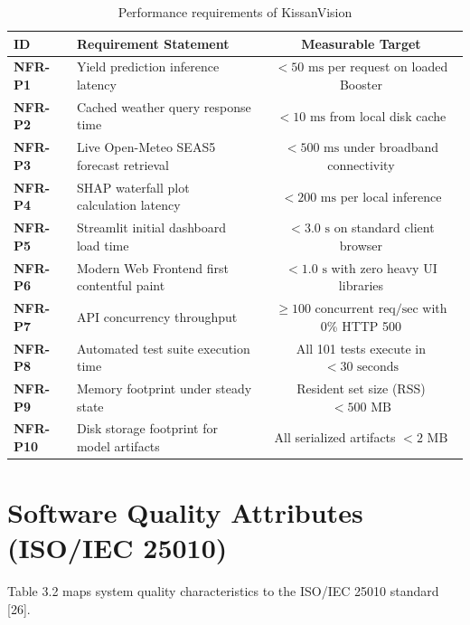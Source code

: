 \documentclass[11pt,a4paper]{report}
\begin{document}
\begin{table}[htbp]
\centering
\small
\caption{Performance requirements of KissanVision}
\begin{tabularx}{\textwidth}{lXc}
\toprule
\textbf{ID} & \textbf{Requirement Statement} & \textbf{Measurable Target} \\
\midrule
\textbf{NFR-P1} & Yield prediction inference latency & $< 50\text{ ms}$ per request on loaded Booster \\
\textbf{NFR-P2} & Cached weather query response time & $< 10\text{ ms}$ from local disk cache \\
\textbf{NFR-P3} & Live Open-Meteo SEAS5 forecast retrieval & $< 500\text{ ms}$ under broadband connectivity \\
\textbf{NFR-P4} & SHAP waterfall plot calculation latency & $< 200\text{ ms}$ per local inference \\
\textbf{NFR-P5} & Streamlit initial dashboard load time & $< 3.0\text{ s}$ on standard client browser \\
\textbf{NFR-P6} & Modern Web Frontend first contentful paint & $< 1.0\text{ s}$ with zero heavy UI libraries \\
\textbf{NFR-P7} & API concurrency throughput & $\ge 100\text{ concurrent req/sec}$ with 0\% HTTP 500 \\
\textbf{NFR-P8} & Automated test suite execution time & All 101 tests execute in $< 30\text{ seconds}$ \\
\textbf{NFR-P9} & Memory footprint under steady state & Resident set size (RSS) $< 500\text{ MB}$ \\
\textbf{NFR-P10}& Disk storage footprint for model artifacts & All serialized artifacts $< 2\text{ MB}$ \\
\bottomrule
\end{tabularx}
\end{table}

\section{Software Quality Attributes (ISO/IEC 25010)}
Table 3.2 maps system quality characteristics to the ISO/IEC 25010 standard [26].
\end{document}
